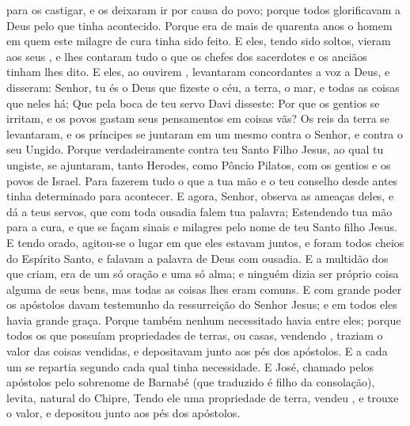 {{} para os castigar, e os deixaram ir por causa do povo; porque todos glorificavam a Deus pelo que tinha acontecido.
  Porque era de mais de quarenta anos o homem em quem este milagre de cura tinha sido feito.
  E eles, tendo sido soltos, vieram aos seus
{},  e lhes contaram tudo o que os chefes dos sacerdotes e os anciãos tinham lhes dito.
  E eles, ao ouvirem
{},  levantaram concordantes a voz a Deus, e disseram: Senhor, tu és o Deus que fizeste o céu, a terra, o mar, e todas as coisas que neles há;
  Que pela boca de teu servo Davi disseste: Por que os gentios se irritam, e os povos gastam seus pensamentos em coisas vãs?
  Os reis da terra se levantaram, e os príncipes se juntaram em um mesmo
{} contra o Senhor, e contra o seu Ungido.
  Porque verdadeiramente contra teu Santo Filho Jesus, ao qual tu ungiste, se ajuntaram, tanto Herodes, como Pôncio Pilatos, com os gentios e os povos de Israel.
  Para fazerem tudo o que a tua mão e o teu conselho desde antes tinha determinado para acontecer.
  E agora, Senhor, observa as ameaças deles, e dá a teus servos, que com toda ousadia falem tua palavra;
  Estendendo tua mão para a cura, e que se façam sinais e milagres pelo nome de teu Santo filho Jesus.
  E tendo orado, agitou-se o lugar em que eles estavam juntos, e foram todos cheios do Espírito Santo, e falavam a palavra de Deus com ousadia.
  E a multidão dos que criam, era de um só oração e uma só alma; e ninguém dizia ser próprio coisa alguma de seus bens, mas todas as coisas lhes eram comuns.
  E com grande poder os apóstolos davam testemunho da ressurreição do Senhor Jesus; e em todos eles havia grande graça.
  Porque também nenhum necessitado havia entre eles; porque todos os que possuíam propriedades de terras, ou casas, vendendo
{},  traziam o valor das coisas vendidas, e
{} depositavam junto aos pés dos apóstolos.
  E a cada um se repartia segundo cada qual tinha necessidade.
  E José, chamado pelos apóstolos pelo sobrenome de Barnabé (que traduzido é filho da consolação), levita, natural do Chipre,
  Tendo ele uma propriedade de terra, vendeu
{},  e trouxe o valor, e
{} depositou junto aos pés dos apóstolos.
\par }

